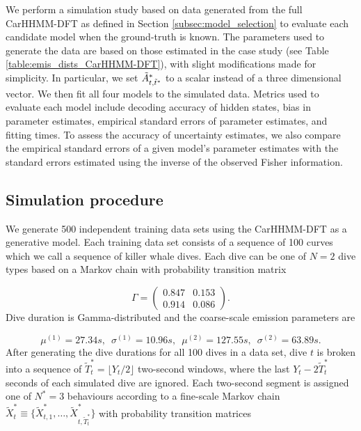
We perform a simulation study based on data generated from the full CarHHMM-DFT as defined in Section \ref{subsec:model_selection} to evaluate each candidate model when the ground-truth is known. The parameters used to generate the data are based on those estimated in the case study (see Table \ref{table:emis_dists_CarHHMM-DFT}), with slight modifications made for simplicity. In particular, we set $\tilde{A}^*_{t,\tilde t^*}$ to a scalar instead of a three dimensional vector. We then fit all four models to the simulated data. Metrics used to evaluate each model include decoding accuracy of hidden states, bias in parameter estimates, empirical standard errors of parameter estimates, and fitting times. To assess the accuracy of uncertainty estimates, we also compare the empirical standard errors of a given model's parameter estimates with the standard errors estimated using the inverse of the observed Fisher information.

\subsection{Simulation procedure}
\label{subsec:data_simulation}

We generate 500 independent training data sets using the CarHHMM-DFT as a generative model. Each training data set consists of a sequence of 100 curves which we call a sequence of killer whale dives. Each dive can be one of $N=2$ dive types based on a Markov chain with probability transition matrix

\[\Gamma = \begin{pmatrix} 0.847 & 0.153 \\ 0.914 & 0.086 \end{pmatrix}.\]
%
Dive duration is Gamma-distributed and the coarse-scale emission parameters are 

\[\mu^{(1)} = 27.34s, \enspace \sigma^{(1)} = 10.96s, \enspace \mu^{(2)} = 127.55s, \enspace \sigma^{(2)} = 63.89s.\]
%
After generating the dive durations for all 100 dives in a data set, dive $t$ is broken into a sequence of $\tilde T^*_t = \lfloor Y_t/2 \rfloor$ two-second windows, where the last $Y_t - 2 \tilde T^*_t$ seconds of each simulated dive are ignored. Each two-second segment is assigned one of $N^*=3$ behaviours according to a fine-scale Markov chain $\tilde X^*_t \equiv \big\{\tilde X^*_{t,1}, \ldots, \tilde X^*_{t,\tilde T^*_t} \big\}$ with probability transition matrices

